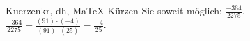 \begin{MAufgabe}{Kuerzen}{kr, dh, MaTeX}
K\"urzen Sie soweit m\"oglich: $\frac{-364}{2275}$.\\ 
\ifLsg\MLoesung
\quad $\frac{-364}{2275}=\frac{(91)\cdot(-4)}{(91)\cdot(25)}=\frac{-4}{25}$.\else\relax\fi
 \end{MAufgabe}